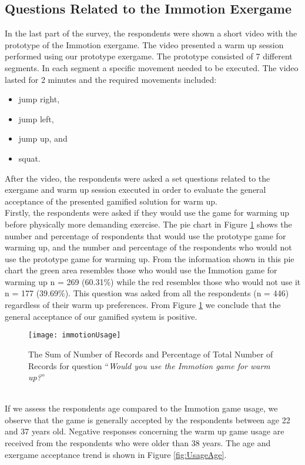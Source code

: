 \subsection{Questions Related to the Immotion Exergame}
In the last part of the survey, the respondents were shown a short video with the prototype of the Immotion exergame. The video presented a warm up session performed using our prototype exergame. The prototype consisted of 7 different segments. In each segment a specific movement needed to be executed. The video lasted for 2 minutes and the required movements included: 
\begin{itemize}
\item jump right,
\item jump left,
\item jump up, and
\item squat.
\end{itemize}
After the video, the respondents were asked a set questions related to the exergame and warm up session executed in order to evaluate the general acceptance of the presented gamified solution for warm up.\\ Firstly, the respondents were asked if they would use the game for warming up before physically more demanding exercise. The pie chart in Figure  \ref{fig:immotionUsage} shows the number and percentage of respondents that would use the prototype game for warming up, and the number and percentage of the respondents who would not use the prototype game for warming up. From the information shown in this pie chart the green area resembles those who would use the Immotion game for warming up n = 269 (60.31\%) while the red resembles those who would not use it n = 177 (39.69\%). This question was asked from all the respondents (n = 446) regardless of their warm up preferences. From Figure \ref{fig:immotionUsage} we conclude that the general acceptance of our gamified system is positive.\\
\begin{figure}[h]
    \centering
    \texttt{[image: immotionUsage]}
    \caption{The Sum of Number of Records and Percentage of Total Number of Records for question ``\textit{Would you use the Immotion game for warm up?}''}
    \label{fig:immotionUsage}
\end{figure}\\
 If we assess the respondents age compared to the Immotion game usage, we observe that the game is generally accepted by the respondents between age 22 and 37 years old. Negative responses concerning the warm up game usage are received from the respondents who were older than 38 years. The age and exergame acceptance trend is shown in Figure \ref{fig:UsageAge}.\\
